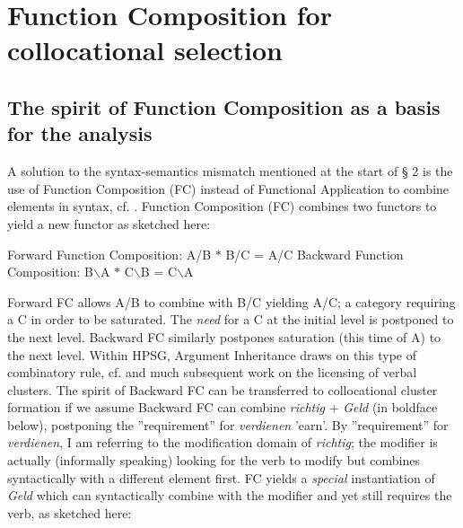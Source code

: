 \documentclass[11pt,a4paper,fleqn]{article}
\begin{document}

\section{Function Composition for collocational selection}

\subsection{The spirit of Function Composition as a basis for the analysis}
A solution to the syntax-semantics mismatch mentioned at the start of § 2 is the use of Function Composition (FC) instead of Functional
Application to combine elements in syntax, cf. \cite{Jacobson1990}. Function Composition (FC) combines two functors to yield a new functor as sketched here:
  
\begin{exe}
   \ex  Forward Function Composition:  A/B $\ast$ B/C = A/C  
   \ex  Backward Function Composition: B$\backslash$A  $\ast$ C$\backslash$B = C$\backslash$A
\end{exe}
 
\noindent Forward FC allows A/B to combine with B/C yielding A/C; a category requiring a C in order to be saturated. The \textit{need} 
for a C at the initial level is postponed to the next level.  Backward FC similarly postpones saturation (this time of A) to the next level. Within HPSG, Argument Inheritance
draws on this type of combinatory rule, cf. \cite{HinrichsNakazawa1994} and much subsequent work on the licensing of verbal clusters. The spirit of Backward FC can be transferred to collocational cluster formation
if we assume Backward FC can combine \textit{richtig} + \textit{Geld} (in boldface below), postponing the ''requirement'' for \textit{verdienen} 'earn'. By 
''requirement'' for \textit{verdienen}, I am referring to the modification domain of \textit{richtig}; the modifier is actually
(informally speaking) looking for the verb to modify but combines syntactically with a different element first. FC yields a 
\textit{special} instantiation of \textit{Geld} which can syntactically combine with the modifier and yet still requires the verb, as sketched here:
\end{document}
